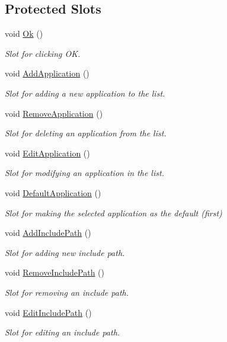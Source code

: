 \subsection*{Protected Slots}
\begin{DoxyCompactItemize}
\item 
void \hyperlink{class_settings_dialog_ab481df9973de4149948ab48fecdc72e6}{Ok} ()
\begin{DoxyCompactList}\small\item\em Slot for clicking O\-K. \end{DoxyCompactList}\item 
void \hyperlink{class_settings_dialog_a2e3bf4130866e8dc57132a57c8d32227}{Add\-Application} ()
\begin{DoxyCompactList}\small\item\em Slot for adding a new application to the list. \end{DoxyCompactList}\item 
void \hyperlink{class_settings_dialog_ab24138c8115b9159d8514a43be4ee920}{Remove\-Application} ()
\begin{DoxyCompactList}\small\item\em Slot for deleting an application from the list. \end{DoxyCompactList}\item 
void \hyperlink{class_settings_dialog_a35eba51f66d3c0ea0a80a8d2bcc96434}{Edit\-Application} ()
\begin{DoxyCompactList}\small\item\em Slot for modifying an application in the list. \end{DoxyCompactList}\item 
void \hyperlink{class_settings_dialog_ac35bf4ace9640cbd6a9df49e0657ab2f}{Default\-Application} ()
\begin{DoxyCompactList}\small\item\em Slot for making the selected application as the default (first) \end{DoxyCompactList}\item 
void \hyperlink{class_settings_dialog_adc2f2cd8c389973e81d13a0f8b6c4b92}{Add\-Include\-Path} ()
\begin{DoxyCompactList}\small\item\em Slot for adding new include path. \end{DoxyCompactList}\item 
void \hyperlink{class_settings_dialog_a68389f7679644452940c5ff841bf7f57}{Remove\-Include\-Path} ()
\begin{DoxyCompactList}\small\item\em Slot for removing an include path. \end{DoxyCompactList}\item 
void \hyperlink{class_settings_dialog_ab285190d065c6fd6edceefa544ccc079}{Edit\-Include\-Path} ()
\begin{DoxyCompactList}\small\item\em Slot for editing an include path. \end{DoxyCompactList}\end{DoxyCompactItemize}
